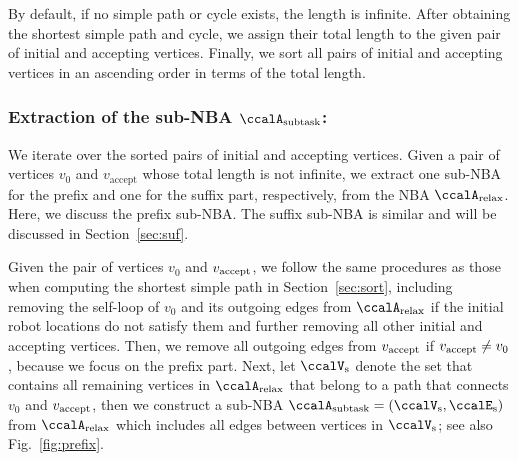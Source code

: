 \documentclass[Afour,sageh,times]{sagej}
\newcommand{\auto}[1]{\ccalA_{\textup{#1}}}
\newcommand{\vertex}[1]{v_{\textup{#1}}}
\begin{document}
{  By default, if no simple path or cycle exists, the length is infinite. After obtaining the shortest simple path and cycle, we assign their total length to the given pair of initial and accepting vertices.  Finally,  we sort all pairs of initial and accepting vertices in an ascending order in terms of the total length.}


  \subsubsection{Extraction of the sub-NBA \upshape $\auto{subtask}$:}\label{sub-NBA:1}
We iterate over the sorted pairs of initial and accepting vertices. Given a pair of vertices  $v_0$ and $v_\text{accept}$ whose total length is not infinite,  we extract one sub-NBA for the prefix and one for the suffix part, respectively, from  the NBA $\auto{relax}$.  Here, we discuss the prefix sub-NBA. The suffix sub-NBA is similar and will be  discussed in Section~\ref{sec:suf}.

Given the pair of vertices $v_0$ and $\vertex{accept}$, we follow the same procedures as those when computing the shortest simple path in Section~\ref{sec:sort}, including removing the self-loop of $v_0$ and its outgoing edges from $\auto{relax}$ if the initial robot locations do not satisfy them and further removing all other initial and accepting vertices. Then, we remove all outgoing edges from $\vertex{accept}$ if $\vertex{accept} \not=v_0$, because we focus on the prefix part. Next, let $\ccalV_{\text{s}}$ denote the set that contains all remaining vertices in $ \auto{relax}$ that belong to a path that connects $v_0$ and $\vertex{accept}$, then we construct a sub-NBA $\auto{subtask}=(\ccalV_{\text{s}}, \ccalE_\text{s})$ from $\auto{relax}$ which includes all edges between vertices in $\ccalV_{\text{s}}$; see also Fig.~\ref{fig:prefix}. %
\end{document}
